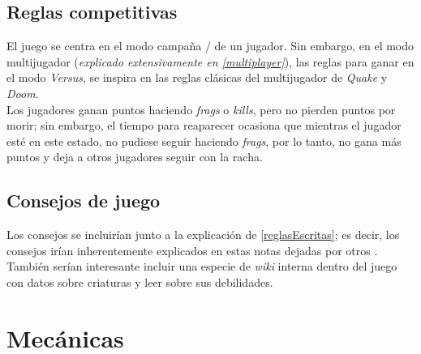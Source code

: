     \subsection{Reglas competitivas}
        El juego se centra en el modo campaña / de un jugador. Sin embargo, en el modo multijugador (\textit{explicado extensivamente en \ref{multiplayer}}), las reglas para ganar en el modo \textit{Versus}, se inspira en las reglas clásicas del multijugador de \textit{Quake} y \textit{Doom}.\\
        Los jugadores ganan puntos haciendo \textit{frags} o \textit{kills}, pero no pierden puntos por morir; sin embargo, el tiempo para reaparecer ocasiona que mientras el jugador esté en este estado, no pudiese seguir haciendo \textit{frags}, por lo tanto, no gana más puntos y deja a otros jugadores seguir con la racha.
    \subsection{Consejos de juego}
        Los consejos se incluirían junto a la explicación de \ref{reglasEscritas}; es decir, los consejos irían inherentemente explicados en estas notas dejadas por otros \hunters. También serían interesante incluir una especie de \textit{wiki} interna dentro del juego con datos sobre criaturas y leer sobre sus debilidades.

\section{Mecánicas}
